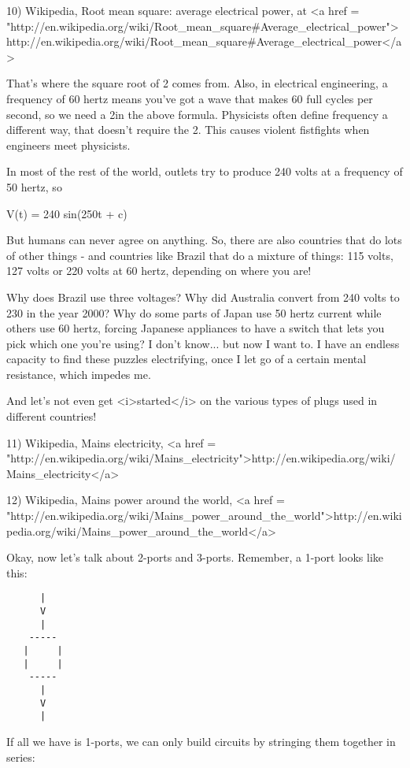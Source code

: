 10) Wikipedia, Root mean square: average electrical power, at
<a href = "http://en.wikipedia.org/wiki/Root_mean_square#Average_electrical_power">http://en.wikipedia.org/wiki/Root_mean_square#Average_electrical_power</a>

That's where the square root of 2 comes from.  Also, in electrical
engineering, a frequency of 60 hertz means you've got a wave that
makes 60 full cycles per second, so we need a 2\pi  in the above
formula.  Physicists often define frequency a different way, that
doesn't require the 2\pi .  This causes violent fistfights when
engineers meet physicists.

In most of the rest of the world, outlets try to produce 240 volts 
at a frequency of 50 hertz, so

V(t) =  240 sin(2\pi  50t + c)

But humans can never agree on anything.  So, there are also countries
that do lots of other things - and countries like Brazil that do a
mixture of things: 115 volts, 127 volts or 220 volts at 60 hertz,
depending on where you are!  

Why does Brazil use three voltages?  Why did Australia convert from 
240 volts to 230 in the year 2000?  Why do some parts of Japan use 50 
hertz current while others use 60 hertz, forcing Japanese appliances 
to have a switch that lets you pick which one you're using?  I don't 
know... but now I want to.  I have an endless capacity to find these
puzzles electrifying, once I let go of a certain mental resistance, 
which impedes me.

And let's not even get <i>started</i> on the various types of plugs used 
in different countries!

11) Wikipedia, Mains electricity, 
<a href = "http://en.wikipedia.org/wiki/Mains_electricity">http://en.wikipedia.org/wiki/Mains_electricity</a>

12) Wikipedia, Mains power around the world,
<a href = "http://en.wikipedia.org/wiki/Mains_power_around_the_world">http://en.wikipedia.org/wiki/Mains_power_around_the_world</a>
 
Okay, now let's talk about 2-ports and 3-ports.  Remember, a 1-port
looks like this:

\begin{verbatim}
      |
      V
      |
    -----
   |     |
   |     |
    -----
      |
      V
      |
\end{verbatim}
    
If all we have is 1-ports, we can only build circuits by stringing
them together in series:

